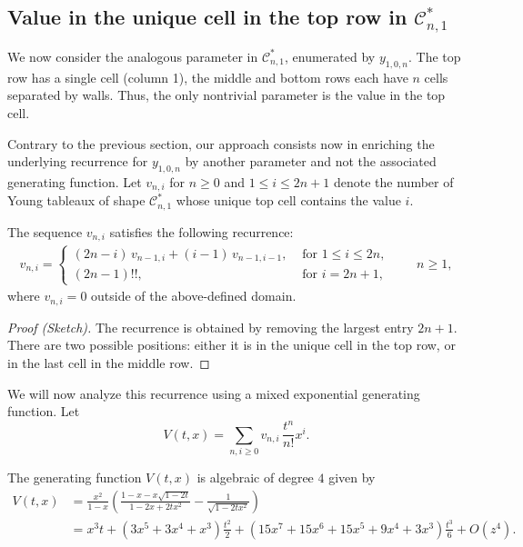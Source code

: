 \documentclass[a4paper,UKenglish,cleveref, autoref, thm-restate]{lipics-v2021}
\newcommand{\Cc}{\mathcal{C}}
\begin{document}
\newcommand{\cp}{v}
\newcommand{\CP}{V}
\subsection{Value in the unique cell in the top row in \texorpdfstring{$\Cc_{n,1}^*$}{C*\_{n,1}}}

We now consider the analogous parameter in $\Cc^*_{n,1}$, enumerated by $y_{1,0,n}$. The top row has a single cell (column 1), the middle and bottom rows each have $n$ cells separated by walls. Thus, the only nontrivial parameter is the value in the top cell.

Contrary to the previous section, our approach consists now in enriching the underlying recurrence for $y_{1,0,n}$ by another parameter and not the associated generating function. 
Let $\cp_{n,i}$ for $n \geq 0 $ and $1\le i\le 2n+1$ denote the number of Young tableaux of
shape $\Cc_{n,1}^*$ whose unique top cell contains the value $i$. 

\begin{lemma}
The sequence $\cp_{n,i}$ satisfies the following recurrence:
\begin{align} \label{eq:recnumy10n}
\cp_{n,i}=
\begin{cases}
(2n-i)\,\cp_{n-1,i} + (i-1)\,\cp_{n-1,i-1}, & \text{ for } 1\le i\le 2n,\\
(2n-1)!!, & \text{ for } i=2n+1,
\end{cases}
\qquad n\ge 1,
\end{align}
where
$\cp_{n,i}=0$ outside of the above-defined domain.  
\end{lemma}

\begin{proof}[Proof (Sketch)]
The recurrence is obtained by removing the largest entry $2n+1$.
There are two possible positions: either it is in the unique cell in the top row, or in the last cell in the middle row. 
\end{proof}

We will now analyze this recurrence using a mixed exponential generating function.
Let 
\[
    \CP(t,x) = \sum_{n,i\ge0} \cp_{n,i} \, \frac{t^n}{n!}x^i .
\]

\begin{proposition}
    The generating function $\CP(t,x)$ is algebraic of degree $4$ given by
    \begin{align*}
        \CP(t,x) &= {\frac {{x}^{2}}{1-x} \left( {\frac {1-x
-x\sqrt {1-2t}}{1-2x+2t{x}^{2}}  }-{\frac {1}{\sqrt {1-2t{x}^{2}}}}
 \right) }
               \\&= 
               {x}^{3}t+ \left( 3x^5 + 3x^4 + x^3 \right) \frac{{t}^{2}}{2}+ \left( 15x^7 + 15x^6 + 15x^5 + 9x^4 + 3x^3 \right) \frac{{t}^{3}}{6}+ O\left( {z}^{4} \right) 
            .
    \end{align*}    
\end{proposition}
\end{document}
